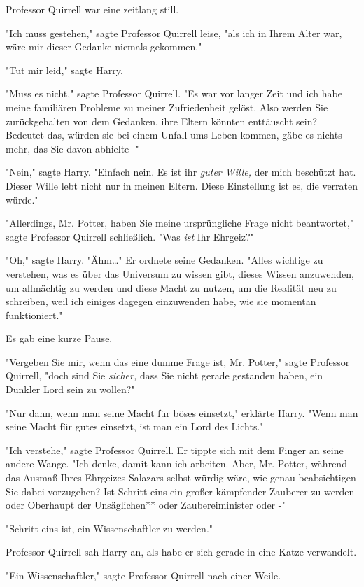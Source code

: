 {Professor Quirrell war eine zeitlang still.

"Ich muss gestehen," sagte Professor Quirrell leise, "als ich in Ihrem Alter war, wäre mir dieser Gedanke niemals gekommen."

"Tut mir leid," sagte Harry.

"Muss es nicht," sagte Professor Quirrell. "Es war vor langer Zeit und ich habe meine familiären Probleme zu meiner Zufriedenheit gelöst. Also werden Sie zurückgehalten von dem Gedanken, ihre Eltern könnten enttäuscht sein? Bedeutet das, würden sie bei einem Unfall ums Leben kommen, gäbe es nichts mehr, das Sie davon abhielte -"

"Nein," sagte Harry. "Einfach nein. Es ist ihr \emph{guter Wille,} der mich beschützt hat. Dieser Wille lebt nicht nur in meinen Eltern. Diese Einstellung ist es, die verraten würde."

"Allerdings, Mr. Potter, haben Sie meine ursprüngliche Frage nicht beantwortet," sagte Professor Quirrell schließlich. "Was \emph{ist} Ihr Ehrgeiz?"

"Oh," sagte Harry. "Ähm…" Er ordnete seine Gedanken. "Alles wichtige zu verstehen, was es über das Universum zu wissen gibt, dieses Wissen anzuwenden, um allmächtig zu werden und diese Macht zu nutzen, um die Realität neu zu schreiben, weil ich einiges dagegen einzuwenden habe, wie sie momentan funktioniert."

Es gab eine kurze Pause.

"Vergeben Sie mir, wenn das eine dumme Frage ist, Mr. Potter," sagte Professor Quirrell, "doch sind Sie \emph{sicher,} dass Sie nicht gerade gestanden haben, ein Dunkler Lord sein zu wollen?"

"Nur dann, wenn man seine Macht für böses einsetzt," erklärte Harry. "Wenn man seine Macht für gutes einsetzt, ist man ein Lord des Lichts."

"Ich verstehe," sagte Professor Quirrell. Er tippte sich mit dem Finger an seine andere Wange. "Ich denke, damit kann ich arbeiten. Aber, Mr. Potter, während das Ausmaß Ihres Ehrgeizes Salazars selbst würdig wäre, wie genau beabsichtigen Sie dabei vorzugehen? Ist Schritt eins ein großer kämpfender Zauberer zu werden oder Oberhaupt der Unsäglichen** oder Zaubereiminister oder -"

"Schritt eins ist, ein Wissenschaftler zu werden."

Professor Quirrell sah Harry an, als habe er sich gerade in eine Katze verwandelt.

"Ein Wissenschaftler," sagte Professor Quirrell nach einer Weile.

}
